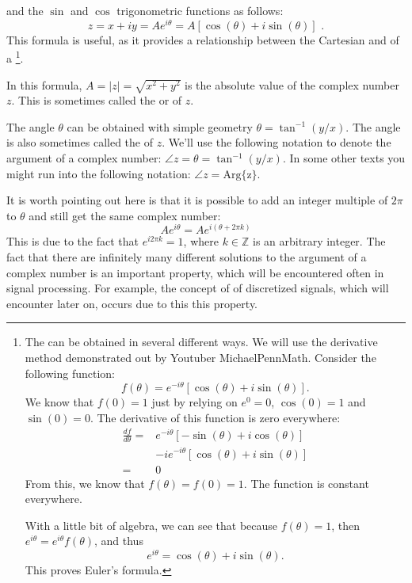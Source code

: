  and the $\sin$ and $\cos$ trigonometric functions as follows:
\begin{equation}
  \boxed{
    z = x + iy = A e^{i\theta} = A[\cos(\theta)+i\sin(\theta)]
  }\,\,.
  \label{eq:eulerintro}
\end{equation}
This formula is useful, as it provides a relationship between the Cartesian and  of a \footnote{The \emph{} can be obtained in several different ways. We will use the derivative method demonstrated out by Youtuber MichaelPennMath. Consider the following function:
\[
f(\theta) = e^{-i\theta}[\cos(\theta)+i\sin(\theta)].
\]
We know that $f(0)=1$ just by relying on $e^0=0$, $\cos(0)=1$ and $\sin(0)=0$. The derivative of this function is zero everywhere:
\begin{align*}
\frac{df}{d\theta} =& e^{-i\theta}[-\sin(\theta)+i\cos(\theta)] \\
&- i e^{-i\theta}[\cos(\theta)+i\sin(\theta)] \\
= & 0
\end{align*}
From this, we know that $f(\theta) = f(0) = 1$. The function is constant everywhere.

With a little bit of algebra, we can see that because $f(\theta)=1$, then $e^{i\theta}=e^{i\theta} f(\theta)$, and thus
\[
e^{i\theta} = \cos(\theta) + i\sin(\theta).
\]
This proves Euler's formula.}.



In this formula, $A = |z|=\sqrt{x^2 + y^2}$ is the absolute value of the complex number $z$. This is sometimes called the \emph{} or
\emph{} of $z$.

The angle $\theta$ can be obtained with simple geometry
$\theta=\tan^{-1}(y/x)$. The angle is also sometimes called the \emph{} of $z$. We'll use the following notation to denote the argument of a complex number: $\angle z = \theta = \tan^{-1}(y/x)$. In some other texts you might run into the following notation: $\angle z = \mathrm{Arg\{z\}}$.

It is worth pointing out here is that it is possible to add an integer
multiple of $2\pi$ to $\theta$ and still get the same complex number:
\begin{equation}
  A e^{i\theta} = A e^{i(\theta + 2\pi k)}
\end{equation}
This is due to the fact that $e^{i2\pi k} = 1$, where
$k \in \mathbb{Z}$ is an arbitrary integer. The fact that there are
infinitely many different solutions to the argument of a complex
number is an important property, which will be encountered often in
signal processing. For example, the concept
of \emph{} of discretized signals, which will
encounter later on, occurs due to this this property.

